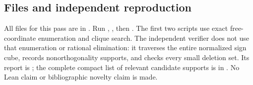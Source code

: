 \subsection{Files and independent reproduction}
All files for this pass are in .
Run , , then .
The first two scripts use exact free-coordinate enumeration and clique
search. The independent verifier does not use that enumeration or
rational elimination: it traverses the entire normalized sign cube,
records nonorthogonality supports, and checks every small deletion set.
Its report is ; the complete compact list of
relevant candidate supports is in .
No Lean claim or bibliographic novelty claim is made.
